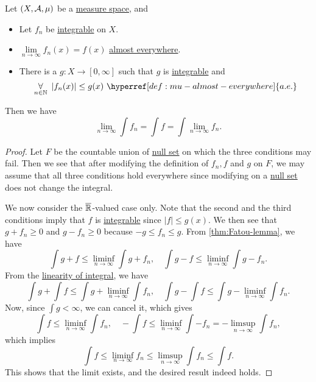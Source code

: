 \begin{theorem}\label{thm:dominated-convergence-theorem}
	Let \((X, \mathcal{\MakeUppercase{a}} , \mu )\) be a \hyperref[def:measure-space]{measure space}, and
	\begin{itemize}
		\item Let \(f_{n}\) be \hyperref[def:integrable]{integrable} on \(X\).
		\item \(\lim\limits_{n \to \infty} f_{n}(x) = f(x)\) \hyperref[def:mu-almost-everywhere]{almost everywhere}.
		\item There is a \(g\colon X\to [0, \infty ]\) such that \(g\) is \hyperref[def:integrable]{integrable} and
		      \[
			      \underset{n\in\mathbb{\MakeUppercase{n}} }{\forall }\ \left\vert f_{n}(x) \right\vert \leq g(x)\ \hyperref[def:mu-almost-everywhere]{a.e.}
		      \]
	\end{itemize}
	Then we have
	\[
		\lim\limits_{n \to \infty} \int f_{n} = \int f = \int \lim\limits_{n \to \infty} f_{n}.
	\]
\end{theorem}
\begin{proof}
	Let \(F\) be the countable union of \hyperref[def:mu-null-set]{null set} on which the three conditions may fail. Then we see that after modifying the definition of \(f_{n}, f\) and \(g\) on \(F\),
	we may assume that all three conditions hold everywhere since modifying on a \hyperref[def:mu-null-set]{null set} does not change the integral.

	\par We now consider the \(\overline{\mathbb{\MakeUppercase{r}} }\)-valued case only. Note that the second and the third conditions
	imply that \(f\) is \hyperref[def:integrable]{integrable} since \(\left\vert f \right\vert \leq g(x)\). We then see that \(g + f_{n}\geq 0\) and \(g - f_{n}\geq 0\) because \(-g\leq f_{n}\leq g\).
	From \autoref{thm:Fatou-lemma}, we have
	\[
		\int g + f \leq \liminf_{n \to \infty} \int g + f_{n},\quad \int g - f\leq \liminf_{n \to \infty} \int g - f_{n}.
	\]
	From the \hyperref[lma:linearity-of-integral]{linearity of integral}, we have
	\[
		\int g + \int f\leq \int g + \liminf_{n \to \infty} \int f_{n},\quad \int g - \int f \leq \int g - \liminf_{n \to \infty} \int f_{n}.
	\]
	Now, since \(\int g<\infty \), we can cancel it, which gives
	\[
		\int f \leq \liminf_{n \to \infty} \int f_{n},\quad -\int f \leq \liminf_{n \to \infty} \int -f_{n} = - \limsup_{n \to \infty} \int f_{n},
	\]
	which implies
	\[
		\int f \leq \liminf_{n \to \infty} f_{n}\leq \limsup_{n \to \infty} \int f_{n}\leq \int f.
	\]
	This shows that the limit exists, and the desired result indeed holds.
\end{proof}

